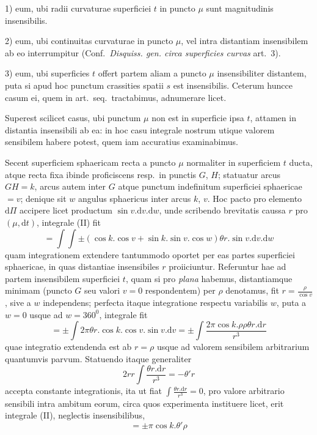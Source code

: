 1) eum, ubi radii curvaturae superficiei $t$ in puncto $\mu$ sunt magnitudinis insensibilis.

2) eum, ubi continuitas curvaturae in puncto $\mu$, vel intra distantiam insensibilem ab eo interrumpitur (Conf.\ \textit{Disquiss. gen. circa superficies curvas} art.\ 3).

3) eum, ubi superficies $t$ offert partem aliam a puncto $\mu$ insensibiliter distantem, puta si apud hoc punctum crassities spatii $s$ est insensibilis. Ceterum huncce casum ei, quem in art.\ seq.\ tractabimus, adnumerare licet.

Superest scilicet casus, ubi punctum $\mu$ non est in superficie ipsa $t$, attamen in distantia insensibili ab ea: in hoc casu integrale nostrum utique valorem sensibilem habere potest, quem iam accuratius examinabimus.

Secent superficiem sphaericam recta a puncto $\mu$ normaliter in superficiem $t$ ducta, atque recta fixa ibinde proficiscens resp.\ in punctis $G$, $H$; statuatur arcus $GH=k$, arcus autem inter $G$ atque punctum indefinitum superficiei sphaericae $=v$; denique sit $w$ angulus sphaericus inter arcus $k$, $v$. Hoc pacto pro elemento $\mathrm{d}\Pi$ accipere licet productum $\sin v.\mathrm{d}v.\mathrm{d}w$, unde scribendo brevitatis caussa $r$ pro $(\mu,\mathrm{d}t)$, integrale (II) fit
\[
=\int\int\pm(\cos k.\cos v+\sin k.\sin v.\cos w)\theta r.\sin v.\mathrm{d}v.\mathrm{d}w
\]
quam integrationem extendere tantummodo oportet per eas partes superficiei sphaericae, in quas distantiae insensibiles $r$ proiiciuntur. Referuntur hae ad partem insensibilem superficiei $t$, quam si pro \textit{plana} habemus, distantiamque minimam (puncto $G$ seu valori $v=0$ respondentem) per $\rho$ denotamus, fit $r=\frac{\rho}{\cos v}$, sive a $w$ independens; perfecta itaque integratione respectu variabilis $w$, puta a $w=0$ usque ad $w=360^0$, integrale fit
\[
=\pm\int2\pi\theta r.\cos k.\cos v.\sin v.\mathrm{d}v=\pm\int\frac{2\pi\cos k.\rho\rho\theta r.\mathrm{d}r}{r^3}
\]
quae integratio extendenda est ab $r=\rho$ usque ad valorem sensibilem arbitrarium quantumvis parvum. Statuendo itaque generaliter
\[
2rr\int\frac{\theta r.\mathrm{d}r}{r^3}=-\theta'r
\]
accepta constante integrationis, ita ut fiat $\int\frac{\theta r.\mathrm{d}r}{r^3}=0$, pro valore arbitrario sensibili intra ambitum eorum, circa quos experimenta instituere licet, erit integrale (II), neglectis insensibilibus,
\[
=\pm\pi\cos k.\theta'\rho
\]

